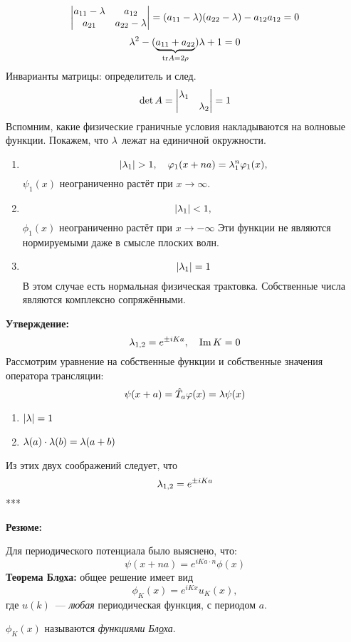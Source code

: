 $$
    \begin{vmatrix}
      a_{11} - \lambda & a_{12} \\
      a_{21} & a_{22} - \lambda \\
    \end{vmatrix}
    = (a_{11} - \lambda)(a_{22} - \lambda) - a_{12} a_{12} = 0
$$
$$
    \lambda^2 - (\underbrace{a_{11} + a_{22}}_{\mathrm{tr} A = 2 \rho}) \lambda + 1 = 0
$$
Инварианты матрицы: определитель и след.
$$
    \det A =
    \begin{vmatrix}
      \lambda_1 &  \\
       & \lambda_2 \\
    \end{vmatrix} = 1
$$
Вспомним, какие физические граничные условия накладываются на волновые функции. Покажем, что $\lambda$ лежат на единичной окружности.
\begin{enumerate}
  \item
    $$
        |\lambda_1| > 1, \quad \varphi_1(x + na) = \lambda_1^n \varphi_1(x),
    $$
    $\psi_1(x)$ неограниченно растёт при $x \to \infty$.
  \item
    $$
        |\lambda_1| < 1,
    $$
    $\phi_1(x)$ неограниченно растёт при $x \to -\infty$
    Эти функции не являются нормируемыми даже в смысле плоских волн.
  \item
    $$
        |\lambda_1| = 1
    $$
    В этом случае есть нормальная физическая трактовка. Собственные числа являются комплексно сопряжёнными.
\end{enumerate}
\textbf{Утверждение:}
$$
    \lambda_{1,2} = e^{\pm i K a}, \quad \textrm{Im} \, K = 0
$$
Рассмотрим уравнение на собственные функции и собственные значения оператора трансляции:
$$
    \psi(x+a) = \Hat T_a \varphi(x) = \lambda \psi(x)
$$
\begin{enumerate}
  \item $|\lambda| = 1$
  \item $\lambda(a) \cdot \lambda(b) = \lambda(a+b)$
\end{enumerate}
Из этих двух соображений следует, что
$$
    \lambda_{1, 2} = e^{\pm i K a}
$$
***

\textbf{Резюме:}

Для периодического потенциала было выяснено, что:
$$
    \psi(x + na) = e^{i K a \cdot n} \phi(x)
$$
\textbf{Теорема Бл\underline{о}ха:}
общее решение имеет вид
$$
    \phi_K(x) = e^{i Kx} u_K(x),
$$
где $u(k)$~--- \emph{любая} периодическая функция, с периодом $a$.

$\phi_K(x)$ называются \emph{функциями Бл\underline{о}ха}.

